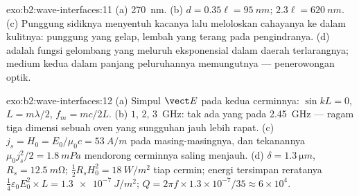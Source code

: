 \begin{solution}{exo:b2:wave-interfaces:11}
(a) \qty{270}{nm}. (b) $d = 0.35\ell = \qty{95}{nm}$; $2.3\ell = \qty{620}{nm}$. (c) Punggung
sidiknya menyentuh kacanya lalu meloloskan cahayanya ke dalam kulitnya: punggung
yang gelap, lembah yang terang pada pengindranya. (d)  adalah
fungsi gelombang yang meluruh eksponensial dalam daerah terlarangnya; medium
kedua dalam panjang peluruhannya memungutnya --- penerowongan optik.
\end{solution}

\begin{solution}{exo:b2:wave-interfaces:12}
(a) Simpul $\vect E$ pada kedua cerminnya: $\sin kL = 0$, $L = m\lambda/2$, $f_m = mc/2L$.
(b) $1$, $2$, \qty{3}{GHz}: tak ada yang pada \qty{2.45}{GHz} --- ragam tiga dimensi
sebuah oven yang sungguhan jauh lebih rapat. (c) $j_s = H_0 = E_0/\mu_0c = \qty{53}{A/m}$
pada masing-masingnya, dan tekanannya $\mu_0j_s^2/2 = \qty{1.8}{mPa}$ mendorong cerminnya
saling menjauh. (d) $\delta = \qty{1.3}{\micro m}$, $R_s = \qty{12.5}{m\ohm}$; $\tfrac12R_sH_0^2 =
\qty{18}{W/m^2}$ tiap cermin; energi tersimpan reratanya $\tfrac14\varepsilon_0E_0^2 \times L = \qty{1.3e-7}{J/m^2}$;
$Q = 2\pi f \times 1.3 \times 10^{-7}/35 \approx 6 \times 10^4$.
\end{solution}

